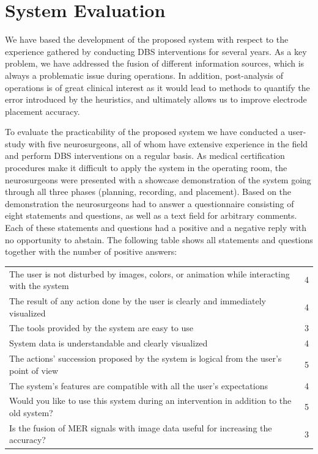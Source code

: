 \documentclass{egpubl}
\begin{document}
\section{System Evaluation}\label{sec:evaluation}
We have based the development of the proposed system with respect to the experience gathered by conducting DBS interventions for several years. As a key problem, we have addressed the fusion of different information sources, which is always a problematic issue during operations. In addition, post-analysis of operations is of great clinical interest as it would lead to methods to quantify the error introduced by the heuristics, and ultimately allows us to improve electrode placement accuracy.

To evaluate the practicability of the proposed system we have conducted a user-study with five neurosurgeons, all of whom have extensive experience in the field and perform DBS interventions on a regular basis. As medical certification procedures make it difficult to apply the system in the operating room, the neurosurgeons were presented with a showcase demonstration of the system going through all three phases (planning, recording, and placement). Based on the demonstration the neurosurgeons had to answer a questionnaire consisting of eight statements and questions, as well as a text field for arbitrary comments. Each of these statements and questions had a positive and a negative reply with no opportunity to abstain. The following table shows all statements and questions together with the number of positive answers:

\noindent \begin{tabular}{p{} c}
\hline
The user is not disturbed by images, colors, or animation while interacting with the system	& 4\\
The result of any action done by the user is clearly and immediately visualized				& 4\\
The tools provided by the system are easy to use												& 3\\
System data is understandable and clearly visualized											& 4\\
The actions' succession proposed by the system is logical from the user's point of view		& 5\\
The system's features are compatible with all the user's expectations							& 4\\
Would you like to use this system during an intervention in addition to the old system?		& 5\\
Is the fusion of MER signals with image data useful for increasing the accuracy?				& 3\\
\hline
\end{tabular}
\end{document}
